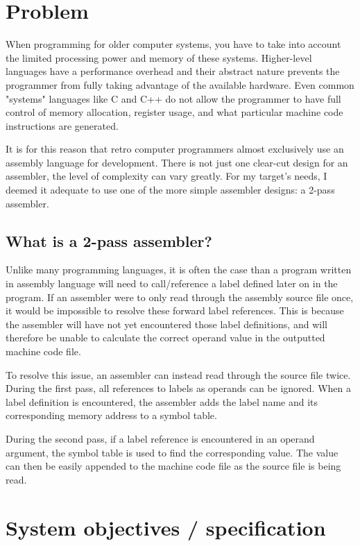 \documentclass[a4paper]{report}
\begin{document}
\section{Problem}

When programming for older computer systems, you have to take into account the
limited processing power and memory of these systems. Higher-level languages
have a performance overhead and their abstract nature prevents the programmer
from fully taking advantage of the available hardware. Even common "systems"
languages like C and C++ do not allow the programmer to have full control of
memory allocation, register usage, and what particular machine code instructions
are generated.

It is for this reason that retro computer programmers almost exclusively use an
assembly language for development. There is not just one clear-cut design for an
assembler, the level of complexity can vary greatly. For my target's needs, I
deemed it adequate to use one of the more simple assembler designs: a 2-pass
assembler.

\subsection{What is a 2-pass assembler?}

Unlike many programming languages, it is often the case than a program written
in assembly language will need to call/reference a label defined later on in the
program. If an assembler were to only read through the assembly source file
once, it would be impossible to resolve these forward label references. This is
because the assembler will have not yet encountered those label definitions, and
will therefore be unable to calculate the correct operand value in the outputted
machine code file.

To resolve this issue, an assembler can instead read through the source file
twice. During the first pass, all references to labels as operands can be
ignored. When a label definition is encountered, the assembler adds the
label name and its corresponding memory address to a symbol table.

During the second pass, if a label reference is encountered in an operand
argument, the symbol table is used to find the corresponding value. The value
can then be easily appended to the machine code file as the source file is being
read.

\section{System objectives / specification}
\end{document}
